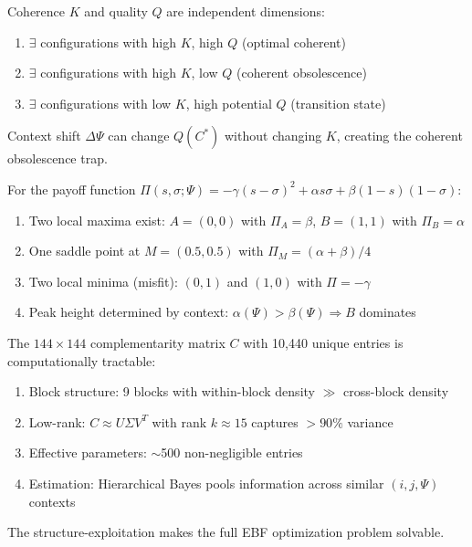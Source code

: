 \begin{theorem}[MP-T15: K-Q Independence]
Coherence $K$ and quality $Q$ are independent dimensions:
\begin{enumerate}
\item $\exists$ configurations with high $K$, high $Q$ (optimal coherent)
\item $\exists$ configurations with high $K$, low $Q$ (coherent obsolescence)
\item $\exists$ configurations with low $K$, high potential $Q$ (transition state)
\end{enumerate}
Context shift $\Delta\Psi$ can change $Q(C^*)$ without changing $K$, creating the coherent obsolescence trap.
\end{theorem}

\begin{theorem}
For the payoff function $\Pi(s,\sigma;\Psi) = -\gamma(s-\sigma)^2 + \alpha s\sigma + \beta(1-s)(1-\sigma)$:
\begin{enumerate}
\item Two local maxima exist: $A = (0,0)$ with $\Pi_A = \beta$, $B = (1,1)$ with $\Pi_B = \alpha$
\item One saddle point at $M = (0.5, 0.5)$ with $\Pi_M = (\alpha + \beta)/4$
\item Two local minima (misfit): $(0,1)$ and $(1,0)$ with $\Pi = -\gamma$
\item Peak height determined by context: $\alpha(\Psi) > \beta(\Psi) \Rightarrow B$ dominates
\end{enumerate}
\end{theorem}

\begin{theorem}
The $144 \times 144$ complementarity matrix $C$ with 10,440 unique entries is computationally tractable:
\begin{enumerate}
\item Block structure: 9 blocks with within-block density $\gg$ cross-block density
\item Low-rank: $C \approx U\Sigma V^T$ with rank $k \approx 15$ captures $>90\%$ variance
\item Effective parameters: $\sim$500 non-negligible entries
\item Estimation: Hierarchical Bayes pools information across similar $(i,j,\Psi)$ contexts
\end{enumerate}
The structure-exploitation makes the full EBF optimization problem solvable.
\end{theorem}

